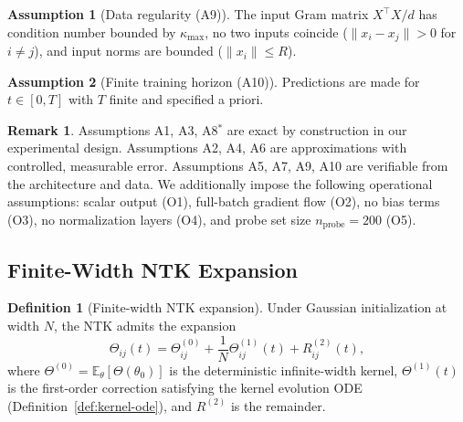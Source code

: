 \documentclass[11pt]{article}
\theoremstyle{definition}
\newtheorem{definition}[theorem]{Definition}
\newtheorem{assumption}{Assumption}
\newtheorem{remark}[theorem]{Remark}
\newcommand{\E}{\mathbb{E}}
\newcommand{\norm}[1]{\lVert #1 \rVert}
\renewcommand{\Theta}{\varTheta}
\begin{document}
\begin{assumption}[Data regularity (A9)]
\label{ass:data}
The input Gram matrix $X^\top X/d$ has condition number bounded by $\kappa_{\max}$, no two inputs coincide ($\norm{x_i - x_j} > 0$ for $i \neq j$), and input norms are bounded ($\norm{x_i} \le R$).
\end{assumption}

\begin{assumption}[Finite training horizon (A10)]
\label{ass:horizon}
Predictions are made for $t \in [0, T]$ with $T$ finite and specified a priori.
\end{assumption}

\begin{remark}
Assumptions A1, A3, A8$^*$ are exact by construction in our experimental design. Assumptions A2, A4, A6 are approximations with controlled, measurable error. Assumptions A5, A7, A9, A10 are verifiable from the architecture and data. We additionally impose the following operational assumptions: scalar output (O1), full-batch gradient flow (O2), no bias terms (O3), no normalization layers (O4), and probe set size $n_{\mathrm{probe}} = 200$ (O5).
\end{remark}

\subsection{Finite-Width NTK Expansion}
\label{sec:expansion}

\begin{definition}[Finite-width NTK expansion]
\label{def:expansion}
Under Gaussian initialization at width $N$, the NTK admits the expansion
\begin{equation}
\label{eq:expansion}
\Theta_{ij}(t) = \Theta^{(0)}_{ij} + \frac{1}{N}\Theta^{(1)}_{ij}(t) + R^{(2)}_{ij}(t),
\end{equation}
where $\Theta^{(0)} = \E_\theta[\Theta(\theta_0)]$ is the deterministic infinite-width kernel, $\Theta^{(1)}(t)$ is the first-order correction satisfying the kernel evolution ODE (Definition~\ref{def:kernel-ode}), and $R^{(2)}$ is the remainder.
\end{definition}
\end{document}
